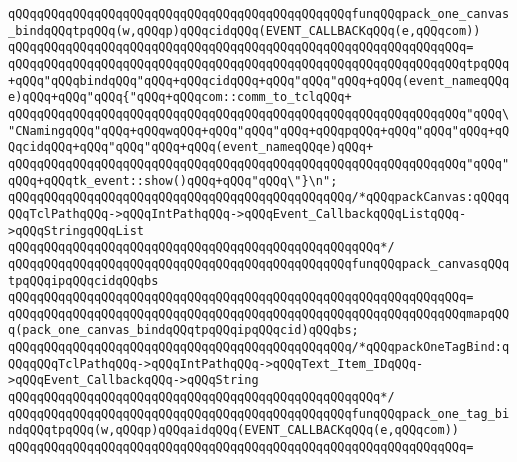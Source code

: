 \verb|qQQqqQQqqQQqqQQqqQQqqQQqqQQqqQQqqQQqqQQqqQQqqQQqfunqQQqpack_one_canvas_bindqQQqtpqQQq(w,qQQqp)qQQqcidqQQq(EVENT_CALLBACKqQQq(e,qQQqcom))|\newline
\verb|qQQqqQQqqQQqqQQqqQQqqQQqqQQqqQQqqQQqqQQqqQQqqQQqqQQqqQQqqQQqqQQq=|\newline
\verb|qQQqqQQqqQQqqQQqqQQqqQQqqQQqqQQqqQQqqQQqqQQqqQQqqQQqqQQqqQQqqQQqtpqQQq+qQQq"qQQqbindqQQq"qQQq+qQQqcidqQQq+qQQq"qQQq"qQQq+qQQq(event_nameqQQqe)qQQq+qQQq"qQQq{"qQQq+qQQqcom::comm_to_tclqQQq+|\newline
\verb|qQQqqQQqqQQqqQQqqQQqqQQqqQQqqQQqqQQqqQQqqQQqqQQqqQQqqQQqqQQqqQQq"qQQq\"CNamingqQQq"qQQq+qQQqwqQQq+qQQq"qQQq"qQQq+qQQqpqQQq+qQQq"qQQq"qQQq+qQQqcidqQQq+qQQq"qQQq"qQQq+qQQq(event_nameqQQqe)qQQq+|\newline
\verb|qQQqqQQqqQQqqQQqqQQqqQQqqQQqqQQqqQQqqQQqqQQqqQQqqQQqqQQqqQQqqQQq"qQQq"qQQq+qQQqtk_event::show()qQQq+qQQq"qQQq\"}\n";|\newline
\newline
\newline
\newline
\verb|qQQqqQQqqQQqqQQqqQQqqQQqqQQqqQQqqQQqqQQqqQQqqQQq/*qQQqpackCanvas:qQQqqQQqTclPathqQQq->qQQqIntPathqQQq->qQQqEvent_CallbackqQQqListqQQq->qQQqStringqQQqList|\newline
\verb|qQQqqQQqqQQqqQQqqQQqqQQqqQQqqQQqqQQqqQQqqQQqqQQqqQQq*/|\newline
\verb|qQQqqQQqqQQqqQQqqQQqqQQqqQQqqQQqqQQqqQQqqQQqqQQqfunqQQqpack_canvasqQQqtpqQQqipqQQqcidqQQqbs|\newline
\verb|qQQqqQQqqQQqqQQqqQQqqQQqqQQqqQQqqQQqqQQqqQQqqQQqqQQqqQQqqQQqqQQq=|\newline
\verb|qQQqqQQqqQQqqQQqqQQqqQQqqQQqqQQqqQQqqQQqqQQqqQQqqQQqqQQqqQQqqQQqmapqQQq(pack_one_canvas_bindqQQqtpqQQqipqQQqcid)qQQqbs;|\newline
\newline
\newline
\newline
\verb|qQQqqQQqqQQqqQQqqQQqqQQqqQQqqQQqqQQqqQQqqQQqqQQq/*qQQqpackOneTagBind:qQQqqQQqTclPathqQQq->qQQqIntPathqQQq->qQQqText_Item_IDqQQq->qQQqEvent_CallbackqQQq->qQQqString|\newline
\verb|qQQqqQQqqQQqqQQqqQQqqQQqqQQqqQQqqQQqqQQqqQQqqQQqqQQq*/|\newline
\verb|qQQqqQQqqQQqqQQqqQQqqQQqqQQqqQQqqQQqqQQqqQQqqQQqfunqQQqpack_one_tag_bindqQQqtpqQQq(w,qQQqp)qQQqaidqQQq(EVENT_CALLBACKqQQq(e,qQQqcom))|\newline
\verb|qQQqqQQqqQQqqQQqqQQqqQQqqQQqqQQqqQQqqQQqqQQqqQQqqQQqqQQqqQQqqQQq=|\newline
